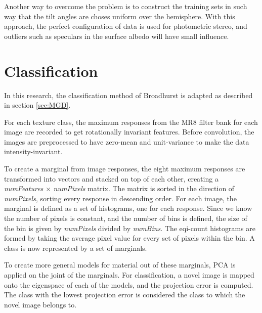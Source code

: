 Another way to overcome the problem is to construct the training sets in such way that the tilt angles are choses uniform over the hemisphere. With this approach, the perfect configuration of data is used for photometric stereo, and outliers such as speculars in the surface albedo will have small influence.

\section{Classification}\label{sec:Classification}

In this research, the classification method of Broadhurst is adapted as described in section \ref{sec:MGD}. 

For each texture class, the maximum responses from the MR8 filter bank for each image are recorded to get rotationally invariant features. Before convolution, the images are preprocessed to have zero-mean and unit-variance to make the data intensity-invariant.

To create a marginal from image responses, the eight maximum responses are transformed into vectors and stacked on top of each other, creating a {\it numFeatures} $\times$ {\it numPixels} matrix. The matrix is sorted in the direction of {\it numPixels}, sorting every response in descending order. For each image, the marginal is defined as a set of histograms, one for each response. Since we know the number of pixels is constant, and the number of bins is defined, the size of the bin is given by {\it numPixels} divided by {\it numBins}. The eqi-count histograms are formed by taking the average pixel value for every set of pixels within the bin. A class is now represented by a set of marginals.

To create more general models for material out of these marginals, PCA is applied on the joint of the marginals. For classification, a novel image is mapped onto the eigenspace of each of the models, and the projection error is computed. The class with the lowest projection error is considered the class to which the novel image belongs to. 

